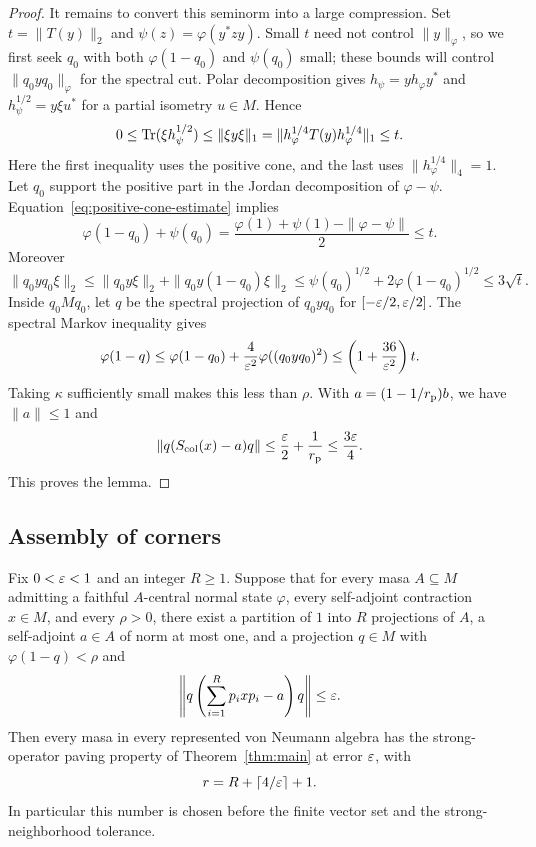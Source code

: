 \begin{proof}
It remains to convert this seminorm into a large compression.  Set
$t=\|T(y)\|_2$ and $\psi(z)=\varphi(y^*zy)$.
Small $t$ need not control $\|y\|_\varphi$, so we first seek $q_0$ with
both $\varphi(1-q_0)$ and $\psi(q_0)$ small; these bounds will control
$\|q_0yq_0\|_\varphi$ for the spectral cut.
Polar decomposition gives
$h_\psi=yh_\varphi y^*$ and
$h_\psi^{1/2}=y\xi u^*$ for a partial isometry $u\in M$.
Hence
\[
 0\leq\operatorname{Tr}(\xi h_\psi^{1/2})
 \leq\|\xi y\xi\|_1
 =\|h_\varphi^{1/4}T(y)h_\varphi^{1/4}\|_1
 \leq t.
\]
Here the first inequality uses the positive cone, and the last uses
$\|h_\varphi^{1/4}\|_4=1$.
Let $q_0$ support the positive part in the Jordan decomposition of
$\varphi-\psi$.  Equation~\eqref{eq:positive-cone-estimate} implies
\begin{equation}\label{eq:jordan-overlap}
 \varphi(1-q_0)+\psi(q_0)
 =\frac{\varphi(1)+\psi(1)-\|\varphi-\psi\|}{2}
 \leq t.
\end{equation}
Moreover
\[
 \|q_0yq_0\xi\|_2
 \leq\|q_0y\xi\|_2+\|q_0y(1-q_0)\xi\|_2
 \leq\psi(q_0)^{1/2}+2\varphi(1-q_0)^{1/2}
 \leq3\sqrt t.
\]
Inside $q_0Mq_0$, let $q$ be the spectral projection of $q_0yq_0$ for
$[-\varepsilon/2,\varepsilon/2]$.  The spectral Markov inequality gives
\begin{equation}\label{eq:symmetric-large-projection}
 \varphi(1-q)
 \leq\varphi(1-q_0)+\frac4{\varepsilon^2}\varphi((q_0yq_0)^2)
 \leq\left(1+\frac{36}{\varepsilon^2}\right)t.
\end{equation}
Taking $\kappa$ sufficiently small makes this less than $\rho$.
With $a=(1-1/r_{\rm p})b$, we have $\|a\|\leq1$ and
\[
 \|q(S_{\rm col}(x)-a)q\|
 \leq\frac{\varepsilon}2+\frac1{r_{\rm p}}
 \leq\frac{3\varepsilon}{4}.
\]
This proves the lemma.
\end{proof}

\subsection{Assembly of corners}

\begin{proposition}\label{prop:state-reduction}
Fix $0<\varepsilon<1$ and an integer $R\geq1$.  Suppose that for every masa
$A\subseteq M$ admitting a faithful $A$-central normal state $\varphi$,
every self-adjoint contraction $x\in M$, and every $\rho>0$, there exist
a partition of $1$ into $R$ projections of $A$, a self-adjoint
$a\in A$ of norm at most one, and a projection $q\in M$ with
$\varphi(1-q)<\rho$ and
\[
 \left\|q\left(\sum_{i=1}^R p_i x p_i-a\right)q\right\|\leq\varepsilon.
\]
Then every masa in every represented von Neumann algebra has the
strong-operator paving property of Theorem~\ref{thm:main} at error
$\varepsilon$, with
\[
 r=R+\lceil4/\varepsilon\rceil+1.
\]
In particular this number is chosen before the finite vector set and
the strong-neighborhood tolerance.
\end{proposition}

